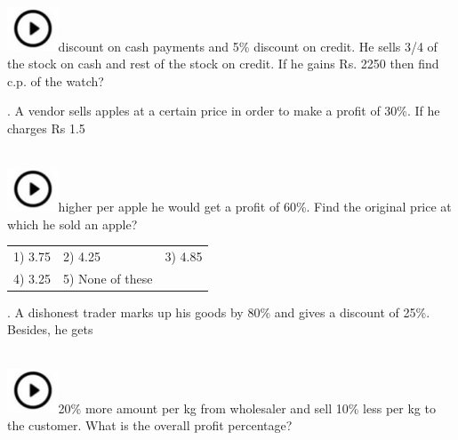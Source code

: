 \documentclass{article}
\begin{document}
	\noindent 
	
	\noindent \noindent \\ \includegraphics*[width=0.60in, height=0.52in]{images/image1}discount on cash payments and 5\% discount on credit. He sells 3/4 of the stock on cash and rest of the stock on credit. If he gains Rs. 2250 then find c.p. of the watch?
	
	\noindent 
	
	\noindent 
	
	\noindent 
	
	. A vendor sells apples at a certain price in order to make a profit of 30\%. If he charges Rs 1.5
	
	\noindent 
	
	\noindent \noindent \\ \includegraphics*[width=0.60in, height=0.52in]{images/image1}higher per apple he would get a profit of 60\%. Find the original price at which he sold an apple?
	
	\noindent 
	
	\noindent  
	\begin{tabular}{p{1.7in} p{1.6in} p{1.6in}} \\ 
 1) 3.75                     & 2) 4.25              & 3) 4.85              \\
4) 3.25              & 5) None of these  \\
\end{tabular}
	
	\noindent 
	
	\noindent 
	
	\noindent 
	
	. A dishonest trader marks up his goods by 80\% and gives a discount of 25\%. Besides, he gets
	
	\noindent \noindent \\ \includegraphics*[width=0.60in, height=0.52in]{images/image1}20\% more amount per kg from wholesaler and sell 10\% less per kg to the customer. What is the overall profit percentage?
	
\end{document}
